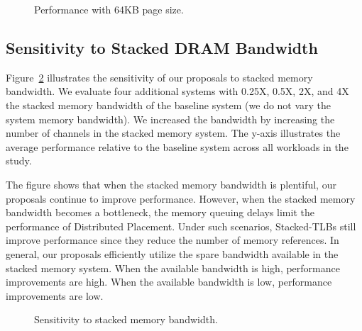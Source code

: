 \begin{figure}[tp] 
\vspace{0. in} \centering
\centerline{}

\caption{\small Performance with 64KB page size.\normalsize}

\label{fig:summary_64k_pages} 
\vspace{-0. in}
\end{figure}

\subsection{Sensitivity to Stacked DRAM Bandwidth}

\noindent Figure~\ref{fig:stack_bw_sense} illustrates the sensitivity
of our proposals to stacked memory bandwidth. We evaluate four
additional systems with 0.25X, 0.5X, 2X, and 4X the stacked memory
bandwidth of the baseline system (we do not vary the system memory
bandwidth). We increased the bandwidth by increasing the number of
channels in the stacked memory system. The y-axis illustrates the
average performance relative to the baseline system across all
workloads in the study.

The figure shows that when the stacked memory bandwidth is plentiful,
our proposals continue to improve performance. However, when the
stacked memory bandwidth becomes a bottleneck, the memory queuing
delays limit the performance of Distributed Placement. Under such
scenarios, Stacked-TLBs still improve performance since they reduce
the number of memory references. In general, our proposals efficiently
utilize the spare bandwidth available in the stacked memory system.
When the available bandwidth is high, performance improvements are
high. When the available bandwidth is low, performance improvements
are low.

\begin{figure}[t] 
\vspace{0.1 in} \centering
\centerline{}

\caption{\small Sensitivity to stacked memory bandwidth. \normalsize}
\label{fig:stack_bw_sense} 
\vspace{-0 in}
\end{figure}

